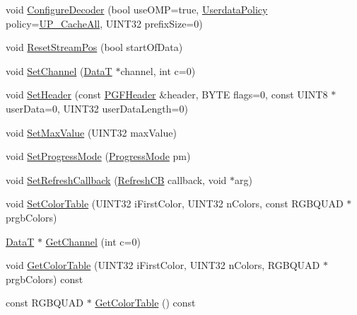 \begin{DoxyCompactItemize}
\item 
void \mbox{\hyperlink{classCPGFImage_a46c30bb2dab1bf3c51f150300b2745b5}{Configure\+Decoder}} (bool use\+O\+MP=true, \mbox{\hyperlink{PGFtypes_8h_a0e70eeba0994fafcbfe6cbea3a734096}{Userdata\+Policy}} policy=\mbox{\hyperlink{PGFtypes_8h_a0e70eeba0994fafcbfe6cbea3a734096ad52de87e33912adabcf1e22f05e38227}{U\+P\+\_\+\+Cache\+All}}, U\+I\+N\+T32 prefix\+Size=0)
\item 
void \mbox{\hyperlink{classCPGFImage_a7df11c06be23e14f83c9aa343f1204d0}{Reset\+Stream\+Pos}} (bool start\+Of\+Data)
\item 
void \mbox{\hyperlink{classCPGFImage_a2f470e1cfdb1300338e32f0926588a6c}{Set\+Channel}} (\mbox{\hyperlink{PGFtypes_8h_acb1ee3f52ccfad782dcaa0abd79e5d05}{DataT}} $\ast$channel, int c=0)
\item 
void \mbox{\hyperlink{classCPGFImage_a200790d3be292a19fe8cbdd78ddfc386}{Set\+Header}} (const \mbox{\hyperlink{structPGFHeader}{P\+G\+F\+Header}} \&header, B\+Y\+TE flags=0, const U\+I\+N\+T8 $\ast$user\+Data=0, U\+I\+N\+T32 user\+Data\+Length=0)
\item 
void \mbox{\hyperlink{classCPGFImage_a6a6370e6737d250360cb6431d885a685}{Set\+Max\+Value}} (U\+I\+N\+T32 max\+Value)
\item 
void \mbox{\hyperlink{classCPGFImage_ad5ec0d246d068c55fdea5712f2b1609c}{Set\+Progress\+Mode}} (\mbox{\hyperlink{PGFtypes_8h_a04561479f4f8aa5a0775d8b541a1157e}{Progress\+Mode}} pm)
\item 
void \mbox{\hyperlink{classCPGFImage_abbca597528f7f9bd28ddd95e8f530e24}{Set\+Refresh\+Callback}} (\mbox{\hyperlink{PGFtypes_8h_a80e898ce785fbd6fb0dfcc5903be79c2}{Refresh\+CB}} callback, void $\ast$arg)
\item 
void \mbox{\hyperlink{classCPGFImage_a35b54c9108fa67d99fad592b415b2bf5}{Set\+Color\+Table}} (U\+I\+N\+T32 i\+First\+Color, U\+I\+N\+T32 n\+Colors, const R\+G\+B\+Q\+U\+AD $\ast$prgb\+Colors)
\item 
\mbox{\hyperlink{PGFtypes_8h_acb1ee3f52ccfad782dcaa0abd79e5d05}{DataT}} $\ast$ \mbox{\hyperlink{classCPGFImage_ae4be1897b3b07449b7e77f95a29032f6}{Get\+Channel}} (int c=0)
\item 
void \mbox{\hyperlink{classCPGFImage_af9e57bf57786030eab6ed17df9d9342e}{Get\+Color\+Table}} (U\+I\+N\+T32 i\+First\+Color, U\+I\+N\+T32 n\+Colors, R\+G\+B\+Q\+U\+AD $\ast$prgb\+Colors) const
\item 
const R\+G\+B\+Q\+U\+AD $\ast$ \mbox{\hyperlink{classCPGFImage_aef236343eaa0809a255d1bea58e9bf9d}{Get\+Color\+Table}} () const
\item 

\end{DoxyCompactItemize}
